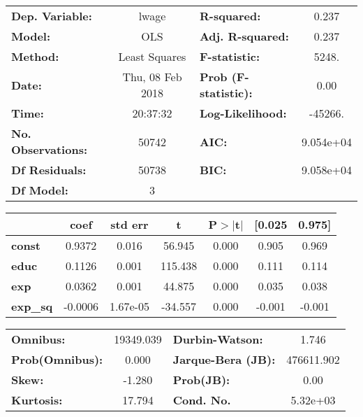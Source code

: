 \begin{center}
\begin{tabular}{lclc}
\toprule
\textbf{Dep. Variable:}    &      lwage       & \textbf{  R-squared:         } &     0.237   \\
\textbf{Model:}            &       OLS        & \textbf{  Adj. R-squared:    } &     0.237   \\
\textbf{Method:}           &  Least Squares   & \textbf{  F-statistic:       } &     5248.   \\
\textbf{Date:}             & Thu, 08 Feb 2018 & \textbf{  Prob (F-statistic):} &     0.00    \\
\textbf{Time:}             &     20:37:32     & \textbf{  Log-Likelihood:    } &   -45266.   \\
\textbf{No. Observations:} &       50742      & \textbf{  AIC:               } & 9.054e+04   \\
\textbf{Df Residuals:}     &       50738      & \textbf{  BIC:               } & 9.058e+04   \\
\textbf{Df Model:}         &           3      & \textbf{                     } &             \\
\bottomrule
\end{tabular}
\begin{tabular}{lcccccc}
                 & \textbf{coef} & \textbf{std err} & \textbf{t} & \textbf{P$>$$|$t$|$} & \textbf{[0.025} & \textbf{0.975]}  \\
\midrule
\textbf{const}   &       0.9372  &        0.016     &    56.945  &         0.000        &        0.905    &        0.969     \\
\textbf{educ}    &       0.1126  &        0.001     &   115.438  &         0.000        &        0.111    &        0.114     \\
\textbf{exp}     &       0.0362  &        0.001     &    44.875  &         0.000        &        0.035    &        0.038     \\
\textbf{exp\_sq} &      -0.0006  &     1.67e-05     &   -34.557  &         0.000        &       -0.001    &       -0.001     \\
\bottomrule
\end{tabular}
\begin{tabular}{lclc}
\textbf{Omnibus:}       & 19349.039 & \textbf{  Durbin-Watson:     } &     1.746   \\
\textbf{Prob(Omnibus):} &    0.000  & \textbf{  Jarque-Bera (JB):  } & 476611.902  \\
\textbf{Skew:}          &   -1.280  & \textbf{  Prob(JB):          } &      0.00   \\
\textbf{Kurtosis:}      &   17.794  & \textbf{  Cond. No.          } &  5.32e+03   \\
\bottomrule
\end{tabular}
\end{center}